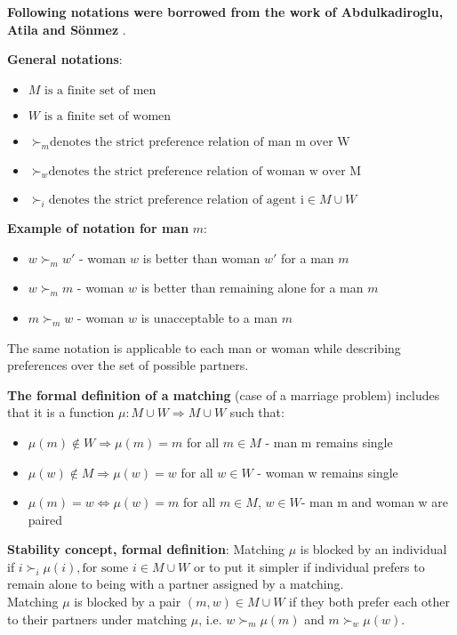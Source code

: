 \documentclass[a4paper]{article} %
\begin{document}
\hfill 
\break
\textbf{Following notations were borrowed from the work of Abdulkadiroglu, Atila and Sönmez} \cite{MainSource}.


\hfill 
\break
\textbf{General notations}:
\begin{itemize}
  \item $M \text{ is a finite set of men}$
  \item $W \text{ is a finite set of women}$
  \item $\succ_m \text{denotes the strict preference relation of man m over W}$
  \item $\succ_w \text{denotes the strict preference relation of woman w over M}$
  \item $\succ_i \text{denotes the strict preference relation of agent i} \in M \cup W$
\end{itemize}

\hfill 
\break
\textbf{Example of notation for man} $m$:
\begin{itemize}
    \item $w \succ_m w'$ - woman $w$ is better than woman $w'$ for a man $m$
    \item $w \succ_m m$ - woman $w$ is better than remaining alone for a man $m$
    \item $m \succ_m w$ - woman $w$ is unacceptable to a man $m$
\end{itemize}
The same notation is applicable to each man or woman while describing preferences over the set of possible partners. 

\hfill 
\break
\textbf{The formal definition of a matching} (case of a marriage problem) includes that it is a function $\mu : M \cup W \Rightarrow M \cup W$ such that:
\begin{itemize}
    \item $\mu(m) \notin W \Rightarrow \mu(m)=m$ for all $m \in M$ - man m remains single
    \item $\mu(w) \notin M \Rightarrow \mu(w)=w$ for all $w \in W$ - woman w remains single
    \item $\mu(m)=w \Leftrightarrow \mu(w)=m$ for all $m \in M$, $w \in W$- man m and woman w are paired
\end{itemize}

\hfill 
\break
\textbf{Stability concept, formal definition}:
Matching $\mu$ is blocked by an individual if $i \succ_i \mu(i), \text{for some } i \in M \cup W$ or to put it simpler if individual prefers to remain alone to being with a partner assigned by a matching.\\
Matching $\mu$ is blocked by a pair $(m,w) \in M \cup W$ if they both prefer each other to their partners under matching $\mu$, i.e. $w \succ_m \mu(m)$ and $m \succ_w \mu(w)$.
\end{document}
